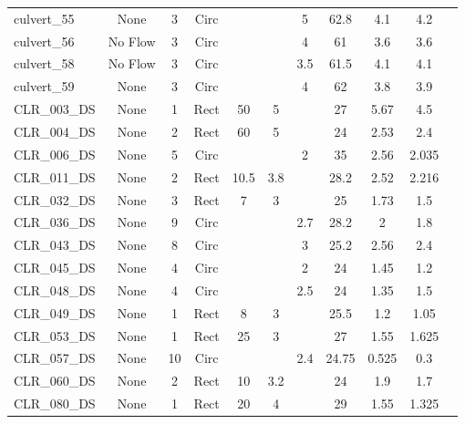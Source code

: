 \begin{table}[]
\begin{tabular}{@{}lcccccccccc@{}}
culvert\_55   & None       & 3        & Circ &        &       & 5        & 62.8   & 4.1       & 4.2        \\
culvert\_56   & No Flow    & 3        & Circ &        &       & 4        & 61     & 3.6       & 3.6        \\
culvert\_58   & No Flow    & 3        & Circ &        &       & 3.5      & 61.5   & 4.1       & 4.1        \\
culvert\_59   & None       & 3        & Circ &        &       & 4        & 62     & 3.8       & 3.9        \\
CLR\_003\_DS  & None       & 1        & Rect & 50     & 5     &          & 27     & 5.67      & 4.5        \\
CLR\_004\_DS  & None       & 2        & Rect & 60     & 5     &          & 24     & 2.53      & 2.4        \\
CLR\_006\_DS  & None       & 5        & Circ &        &       & 2        & 35     & 2.56      & 2.035      \\
CLR\_011\_DS  & None       & 2        & Rect & 10.5   & 3.8   &          & 28.2   & 2.52      & 2.216      \\
CLR\_032\_DS  & None       & 3        & Rect & 7      & 3     &          & 25     & 1.73      & 1.5        \\
CLR\_036\_DS  & None       & 9        & Circ &        &       & 2.7      & 28.2   & 2         & 1.8        \\
CLR\_043\_DS  & None       & 8        & Circ &        &       & 3        & 25.2   & 2.56      & 2.4        \\
CLR\_045\_DS  & None       & 4        & Circ &        &       & 2        & 24     & 1.45      & 1.2        \\
CLR\_048\_DS  & None       & 4        & Circ &        &       & 2.5      & 24     & 1.35      & 1.5        \\
CLR\_049\_DS  & None       & 1        & Rect & 8      & 3     &          & 25.5   & 1.2       & 1.05       \\
CLR\_053\_DS  & None       & 1        & Rect & 25     & 3     &          & 27     & 1.55      & 1.625      \\
CLR\_057\_DS  & None       & 10       & Circ &        &       & 2.4      & 24.75  & 0.525     & 0.3        \\
CLR\_060\_DS  & None       & 2        & Rect & 10     & 3.2   &          & 24     & 1.9       & 1.7        \\
CLR\_080\_DS  & None       & 1        & Rect & 20     & 4     &          & 29     & 1.55      & 1.325      \\

\end{tabular}
\end{table}
